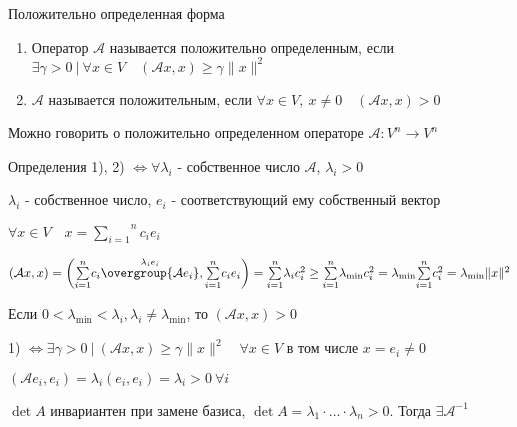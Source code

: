 \documentclass[12pt]{article}
\begin{document}
    \hypertarget{positivedefinedoperator}{}

    \Def Положительно определенная форма

    \begin{enumerate}[label*=\arabic*) ]
        \item Оператор $\mathcal{A}$ называется положительно определенным, если $\exists \gamma > 0 \ | \ \forall x \in V \quad (\mathcal{A}x, x) \geq \gamma \|x\|^2$

        \item $\mathcal{A}$ называется положительным, если
        $\forall x \in V, \ x \neq 0 \quad (\mathcal{A}x, x) > 0$
    \end{enumerate}

    \Nota Можно говорить о положительно определенном операторе $\mathcal{A}: V^n \rightarrow V^n$

    \begin{MyTheorem}
        \Ths Определения 1), 2) $\Longleftrightarrow \forall \lambda_i$ - собственное число $\mathcal{A}$, $\lambda_i > 0$
    \end{MyTheorem}

    \begin{MyProof}
        \fbox{$\Longrightarrow$} $\lambda_i$ - собственное число, $e_i$ - соответствующий ему собственный вектор

        $\forall x \in V \quad x = \overset{n}{\underset{i = 1}{\sum}} c_i e_i$

        $(\mathcal{A}x, x) = \left(\overset{n}{\underset{i = 1}{\sum}} c_i \overset{\lambda_i e_i}{\overgroup{\mathcal{A}e_i}}, \overset{n}{\underset{i = 1}{\sum}} c_i e_i\right) =
        \overset{n}{\underset{i = 1}{\sum}} \lambda_i c_i^2 \geq \overset{n}{\underset{i = 1}{\sum}}\lambda_{\min} c_i^2 =
        \lambda_{\min} \overset{n}{\underset{i = 1}{\sum}}c_i^2 = \lambda_{\min} \|x\|^2$

        Если $0 < \lambda_{\min} < \lambda_i, \lambda_i \neq \lambda_{\min}$, то $(\mathcal{A}x, x) > 0$

        \fbox{$\Longleftarrow$} 1) $\Longleftrightarrow \exists \gamma > 0 \ | \ (\mathcal{A}x, x) \geq \gamma \|x\|^2 \quad \forall x \in V$ в том числе $x = e_i \neq 0$

        $(\mathcal{A}e_i, e_i) = \lambda_i (e_i, e_i) = \lambda_i > 0 \ \forall i$

    \end{MyProof}

    \Notas $\det A$ инвариантен при замене базиса, $\det A = \lambda_1 \cdot \dots \cdot \lambda_n > 0$. Тогда $\exists \mathcal{A}^{-1}$
\end{document}

